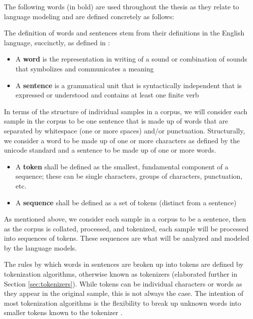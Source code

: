 \documentclass[12pt]{article}
\begin{document}
The following words (in bold) are used throughout the thesis as they relate to language modeling and are defined concretely as follows:

The definition of words and sentences stem from their definitions in the English language, succinctly, as defined in \cite{noauthor_american_2011}:

\begin{itemize}
    \item A \textbf{word} is the representation in writing of a sound or combination of sounds that symbolizes and communicates a meaning
    \item A \textbf{sentence} is a grammatical unit that is syntactically independent that is expressed or understood and contains at least one finite
          verb
\end{itemize}

\noindent
In terms of the structure of individual samples in a corpus, we will consider each sample in the corpus to be one sentence that is made up of words
that are separated by whitespace (one or more spaces) and/or punctuation. Structurally, we consider a word to be made up of one or more characters
as defined by the unicode standard \cite{allen_unicode_2012} and a sentence to be made up of one or more words.

\begin{itemize}
    \item A \textbf{token} shall be defined as the smallest, fundamental component of a sequence; these can be single characters, groups of
          characters, punctuation, etc. \cite{devlin_bert_2019,wu_googles_2016,sennrich_neural_2016}
    \item A \textbf{sequence} shall be defined as a set of tokens (distinct from a sentence)
\end{itemize}

\noindent
As mentioned above, we consider each sample in a corpus to be a sentence, then as the corpus is collated, processed, and tokenized, each sample will
be processed into sequences of tokens. These sequences are what will be analyzed and modeled by the language models.

The rules by which words in sentences are broken up into tokens are defined by tokenization algorithms, otherwise known as tokenizers (elaborated
further in Section \ref{sec:tokenizers}). While tokens can be individual characters or words as they appear in the original sample, this is not always
the case. The intention of most tokenization algorithms is the flexibility to break up unknown words into smaller tokens known to the tokenizer
\cite{wu_googles_2016,sennrich_neural_2016}.
\end{document}
